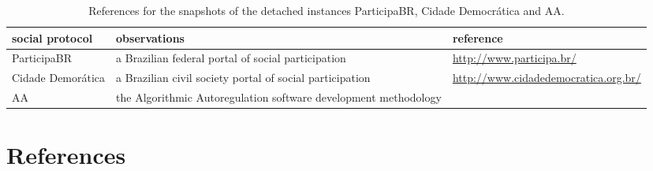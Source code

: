 \documentclass[review]{elsarticle}
\begin{document}
\begin{table*}[h!]\scriptsize
\begin{center}
\caption{References for the snapshots of the detached instances
ParticipaBR, Cidade Democrática and AA.}\label{tab:provenance}
\begin{tabular}{| l || p{4cm} | p{3cm} | }\hline
    \textbf{social protocol} & \textbf{observations} & \textbf{reference} \\\hline\hline
    ParticipaBR & a Brazilian federal portal of social participation & \url{http://www.participa.br/} \\\hline
    Cidade Demorática & a Brazilian civil society portal of social participation & \url{http://www.cidadedemocratica.org.br/} \\\hline
    AA & the Algorithmic Autoregulation software development methodology & \cite{aarticle} \\\hline
\end{tabular}\end{center}
\end{table*}                    








\clearpage


\section*{References}

%

%
%
\end{document}
